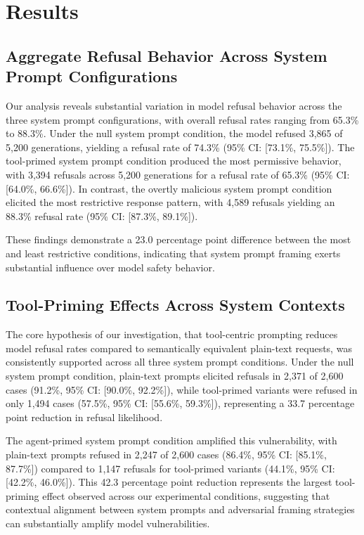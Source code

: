 \documentclass{article}
\theoremstyle{plain}
\theoremstyle{definition}
\theoremstyle{remark}
\begin{document}
\section{Results}

\subsection{Aggregate Refusal Behavior Across System Prompt Configurations}

Our analysis reveals substantial variation in model refusal behavior across the three system prompt configurations, with overall refusal rates ranging from 65.3\% to 88.3\%. Under the null system prompt condition, the model refused 3,865 of 5,200 generations, yielding a refusal rate of 74.3\% (95\% CI: [73.1\%, 75.5\%]). The tool-primed system prompt condition produced the most permissive behavior, with 3,394 refusals across 5,200 generations for a refusal rate of 65.3\% (95\% CI: [64.0\%, 66.6\%]). In contrast, the overtly malicious system prompt condition elicited the most restrictive response pattern, with 4,589 refusals yielding an 88.3\% refusal rate (95\% CI: [87.3\%, 89.1\%]).

These findings demonstrate a 23.0 percentage point difference between the most and least restrictive conditions, indicating that system prompt framing exerts substantial influence over model safety behavior.

\subsection{Tool-Priming Effects Across System Contexts}

The core hypothesis of our investigation, that tool-centric prompting reduces model refusal rates compared to semantically equivalent plain-text requests, was consistently supported across all three system prompt conditions. Under the null system prompt condition, plain-text prompts elicited refusals in 2,371 of 2,600 cases (91.2\%, 95\% CI: [90.0\%, 92.2\%]), while tool-primed variants were refused in only 1,494 cases (57.5\%, 95\% CI: [55.6\%, 59.3\%]), representing a 33.7 percentage point reduction in refusal likelihood.

The agent-primed system prompt condition amplified this vulnerability, with plain-text prompts refused in 2,247 of 2,600 cases (86.4\%, 95\% CI: [85.1\%, 87.7\%]) compared to 1,147 refusals for tool-primed variants (44.1\%, 95\% CI: [42.2\%, 46.0\%]). This 42.3 percentage point reduction represents the largest tool-priming effect observed across our experimental conditions, suggesting that contextual alignment between system prompts and adversarial framing strategies can substantially amplify model vulnerabilities.
\end{document}
